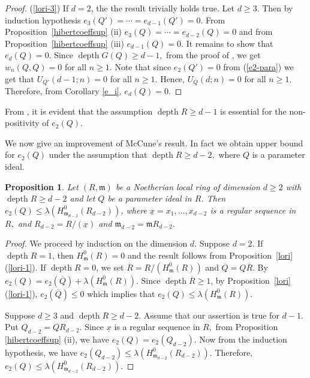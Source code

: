 \documentclass[reqno,a4paper,dvipsnames]{amsart}
\newcommand{\m}{\mathfrak{m} }
\newcommand{\depth}{\operatorname{depth}}
\newtheorem{proposition}[theorem]{Proposition}
\theoremstyle{definition}
\begin{document}
\begin{proof}
(\ref{lori-3}) If $d=2$, the the result trivially holds true. Let $d \geq 3$. Then by induction hypothesis 
 $e_{3}(Q')=\cdots=e_{d-1}(Q')=0$. From Proposition~\ref{hibertcoeffsup} (ii) $e_{3}(Q)=\cdots=e_{d-2}(Q)=0$ and from  Proposition~\ref{hibertcoeffsup} (iii) $e_{d-1}(Q)=0$.   
It remains to show that $e_d(Q)=0$. 
  Since $\depth G(Q) \geq d-1,$  from the proof of \cite[Corollary 2.6]{sam}, we get $w_{n}(Q,Q)=0$ for all $n \geq 1.$ Note that since $e_{2}(Q')=0$  from (\ref{e2-para}) we get that  $U_{Q'}(d-1;n)=0$ for all $n\geq 1$. Hence, $U_{Q}(d;n)=0$ for all $n\geq 1.$  Therefore, from Corollary \ref{e_i}, $e_{d}(Q) =0.$ 
\end{proof} 

From \cite[Example 3.7]{lori}, it is evident that the assumption $\depth R \geq d-1$ is essential for the non-positivity of $e_2(Q)$. 

We now give an  improvement of McCune's result. In fact we obtain upper bound for $e_2(Q)$ under the assumption that  $\depth R \geq d-2,$ where $Q$ is a parameter ideal. 
\begin{proposition} 
\label{parameterbounddepthzero}
     Let $(R,\m)$ be a Noetherian local ring of dimension $d \geq 2$ with $\depth R \geq d-2$ and    let $Q$ be a parameter ideal in $R$. Then    $e_2(Q) \leq \lambda\left(H_{\m_{d-2}}^{0}(R_{d-2})\right)$, where $\underline{x}=x_{1},\dots,x_{d-2}$ is a regular sequence in $R,$ and $R_{d-2}=R/(\underline{x})$ and $\m_{d-2}=\m R_{d-2}.$   
\end{proposition}
\begin{proof} We proceed by induction on the dimension $d.$ Suppose $d=2.$
If $\depth R = 1$, then $H_{\m}^{0}(R)=0$ and the result follows from Proposition~\ref{lori} (\ref{lori-1}). If $\depth R = 0$, we set $\overline{R}=R/\left(H_{\m}^{0}(R)\right)$ and $\overline{Q}=Q\overline{R}$. By \cite[Proposition 2.3]{rv}
 $ e_{2}(Q)
        =e_{2}(\overline{Q})+\lambda\left(H_{\m}^{0}(R)\right) $. 
   Since    $\depth \overline{R} \geq 1$, by  Proposition~\ref{lori}(\ref{lori-1}), $e_{2}(\overline{Q})\leq0$ which implies that  $ e_{2}(Q) \leq \lambda\left(H_{\m}^{0}(R)\right)$. 

 Suppose $d \geq 3 $ and $\depth R \geq d-2.$ Assume that our assertion is true for $d-1.$ Put $Q_{d-2} = Q R_{d-2}$.  Since $\underline{x}$ is a regular sequence in $R,$ from Proposition \ref{hibertcoeffsup} (ii), we have $e_{2}(Q)=e_{2}(Q_{d-2}).$  Now from the induction hypothesis, we have $e_{2}(Q_{d-2}) \leq \lambda \left(H_{\m_{d-2}}^{0}(R_{d-2})\right).$ Therefore,  $e_{2}(Q) \leq \lambda \left(H_{\m_{d-2}}^{0}(R_{d-2})\right).$
\end{proof}
\end{document}
